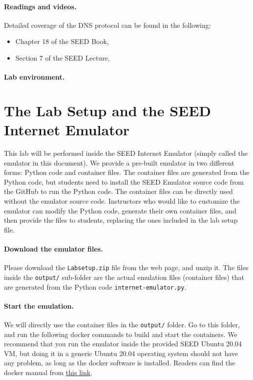 \paragraph{Readings and videos.}
Detailed coverage of the DNS protocol can be found in the following:

\begin{itemize}
\item Chapter 18 of the SEED Book, \seedbook
\item Section 7 of the SEED Lecture, \seedisvideo
\end{itemize}


\paragraph{Lab environment.} 
\seedenvironmentB
\nodependency


\section{The Lab Setup and the SEED Internet Emulator}

This lab will be performed inside the SEED Internet Emulator (simply
called the emulator in this document).
We provide a pre-built emulator in two different forms: Python code
and container files. The container files are generated from
the Python code, but students need to install the SEED Emulator source
code from the GitHub to run the Python code. The container files
can be directly used without the emulator source code.
Instructors who would like to customize the emulator can modify the Python
code, generate their own container files, and then provide the
files to students, replacing the ones included in the
lab setup file.


\paragraph{Download the emulator files.}
Please download the \texttt{Labsetup.zip} file from the web page, and
unzip it. The files inside the \texttt{output/} sub-folder are the actual
emulation files (container files) that are
generated from the Python code \texttt{internet-emulator.py}.


\paragraph{Start the emulation.}
We will directly use the container files in the \texttt{output/} folder.
Go to this folder, and run the following docker commands
to build and start the containers. We recommend that you run the emulator inside
the provided SEED Ubuntu 20.04 VM, but doing it in a generic Ubuntu 20.04 operating system
should not have any problem, as long as the docker software is installed.
Readers can find the docker manual from
\href{https://github.com/seed-labs/seed-labs/blob/master/manuals/docker/SEEDManual-Container.md}
{\underline{this link}}.

